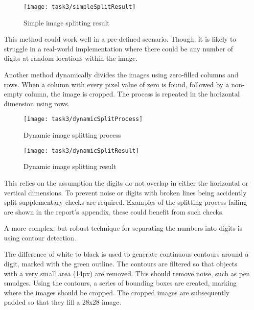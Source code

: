 \begin{figure}[!htbp]
    \centering
    \texttt{[image: task3/simpleSplitResult]}
    \caption[Simple image splitting result]
    {Simple image splitting result}
    \label{fig:simpleSplitResult}
\end{figure}

This method could work well in a pre-defined scenario. Though, it is likely to struggle in a real-world implementation where there could be any number of digits at random locations within the image.

\pagebreak
Another method dynamically divides the images using zero-filled columns and rows. When a column with every pixel value of zero is found, followed by a non-empty column, the image is cropped. The process is repeated in the horizontal dimension using rows.

\begin{figure}[!htbp]
    \centering
    \texttt{[image: task3/dynamicSplitProcess]}
    \caption[Dynamic image splitting process]
    {Dynamic image splitting process}
    \label{fig:dynamicSplitProcess}
\end{figure}

\begin{figure}[!htbp]
    \centering
    \texttt{[image: task3/dynamicSplitResult]}
    \caption[Dynamic image splitting result]
    {Dynamic image splitting result}
    \label{fig:dynamicSplitResult}
\end{figure}

This relies on the assumption the digits do not overlap in either the horizontal or vertical dimensions. To prevent noise or digits with broken lines being accidently split supplementary checks are required. Examples of the splitting process failing are shown in the report's appendix, these could benefit from such checks.

\pagebreak
A more complex, but robust technique for separating the numbers into digits is using contour detection. 

The difference of white to black is used to generate continuous contours around a digit, marked with the green outline. The contours are filtered so that objects with a very small area (14px) are removed. This should remove noise, such as pen smudges. Using the contours, a series of bounding boxes are created, marking where the images should be cropped. The cropped images are subsequently padded so that they fill a 28x28 image.

